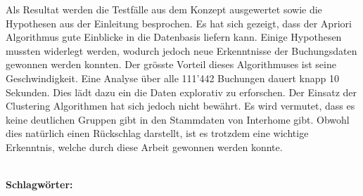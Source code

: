 Als Resultat werden die Testfälle aus dem Konzept ausgewertet sowie die Hypothesen aus der Einleitung besprochen. Es hat sich gezeigt, dass der Apriori Algorithmus gute Einblicke in die Datenbasis liefern kann. Einige Hypothesen mussten widerlegt werden, wodurch jedoch neue Erkenntnisse der Buchungsdaten gewonnen werden konnten. Der grösste Vorteil dieses Algorithmuses ist seine Geschwindigkeit. Eine Analyse über alle 111'442 Buchungen dauert knapp 10 Sekunden. Dies lädt dazu ein die Daten explorativ zu erforschen. Der Einsatz der Clustering Algorithmen hat sich jedoch nicht bewährt. Es wird vermutet, dass es keine deutlichen Gruppen gibt in den Stammdaten von Interhome gibt. Obwohl dies natürlich einen Rückschlag darstellt, ist es trotzdem eine wichtige Erkenntnis, welche durch diese Arbeit gewonnen werden konnte. 

%
\mbox{}\\[0.5\baselineskip]\noindent
\textbf{Schlagwörter:} 
